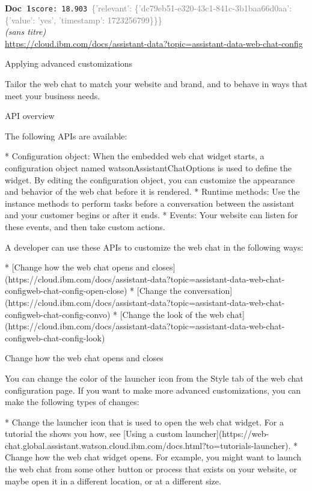 \documentclass[a4paper,11pt]{article}
\begin{document}
\begin{docenv}
{\footnotesize\textcolor{doccolor}{\textbf{Doc~1}}}\hfill{\tiny\texttt{score:~18.903}}\ {\tiny\textcolor{gray}{\{'relevant': \{'dc79eb51-e320-43c1-841c-3b1baa66d0aa': \{'value': 'yes', 'timestamp': 1723256799\}\}\}}}\\[3pt]
{\small\textit{(sans titre)}}\\[2pt]
{\tiny\url{https://cloud.ibm.com/docs/assistant-data?topic=assistant-data-web-chat-config}}\\[4pt]
{\footnotesize 
Applying advanced customizations 

Tailor the web chat to match your website and brand, and to behave in ways that meet your business needs.



 API overview 

The following APIs are available:



* Configuration object: When the embedded web chat widget starts, a configuration object named watsonAssistantChatOptions is used to define the widget. By editing the configuration object, you can customize the appearance and behavior of the web chat before it is rendered.
* Runtime methods: Use the instance methods to perform tasks before a conversation between the assistant and your customer begins or after it ends.
* Events: Your website can listen for these events, and then take custom actions.



A developer can use these APIs to customize the web chat in the following ways:



* [Change how the web chat opens and closes](https://cloud.ibm.com/docs/assistant-data?topic=assistant-data-web-chat-configweb-chat-config-open-close)
* [Change the conversation](https://cloud.ibm.com/docs/assistant-data?topic=assistant-data-web-chat-configweb-chat-config-convo)
* [Change the look of the web chat](https://cloud.ibm.com/docs/assistant-data?topic=assistant-data-web-chat-configweb-chat-config-look)







 Change how the web chat opens and closes 

You can change the color of the launcher icon from the Style tab of the web chat configuration page. If you want to make more advanced customizations, you can make the following types of changes:



* Change the launcher icon that is used to open the web chat widget. For a tutorial the shows you how, see [Using a custom launcher](https://web-chat.global.assistant.watson.cloud.ibm.com/docs.html?to=tutorials-launcher).
* Change how the web chat widget opens. For example, you might want to launch the web chat from some other button or process that exists on your website, or maybe open it in a different location, or at a different size.}
\end{docenv}
\end{document}
